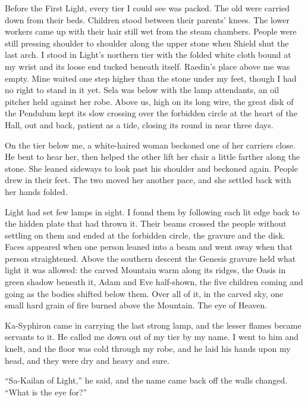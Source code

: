 Before the First Light, every tier I could see was packed. The old were carried down from their beds. Children stood between their parents' knees. The lower workers came up with their hair still wet from the steam chambers. People were still pressing shoulder to shoulder along the upper stone when Shield shut the last arch. I stood in Light's northern tier with the folded white cloth bound at my wrist and its loose end tucked beneath itself. Raedin's place above me was empty. Mine waited one step higher than the stone under my feet, though I had no right to stand in it yet. Sela was below with the lamp attendants, an oil pitcher held against her robe. Above us, high on its long wire, the great disk of the Pendulum kept its slow crossing over the forbidden circle at the heart of the Hall, out and back, patient as a tide, closing its round in near three days.\par

On the tier below me, a white-haired woman beckoned one of her carriers close. He bent to hear her, then helped the other lift her chair a little farther along the stone. She leaned sideways to look past his shoulder and beckoned again. People drew in their feet. The two moved her another pace, and she settled back with her hands folded.\par

Light had set few lamps in sight. I found them by following each lit edge back to the hidden plate that had thrown it. Their beams crossed the people without settling on them and ended at the forbidden circle, the gravure and the disk. Faces appeared when one person leaned into a beam and went away when that person straightened. Above the southern descent the Genesis gravure held what light it was allowed: the carved Mountain warm along its ridges, the Oasis in green shadow beneath it, Adam and Eve half-shown, the five children coming and going as the bodies shifted below them. Over all of it, in the carved sky, one small hard grain of fire burned above the Mountain. The eye of Heaven.\par

\ornament

Ka-Syphiron came in carrying the last strong lamp, and the lesser flames became servants to it. He called me down out of my tier by my name. I went to him and knelt, and the floor was cold through my robe, and he laid his hands upon my head, and they were dry and heavy and sure.\par

``Sa-Kailan of Light,'' he said, and the name came back off the walls changed. ``What is the eye for?''\par

